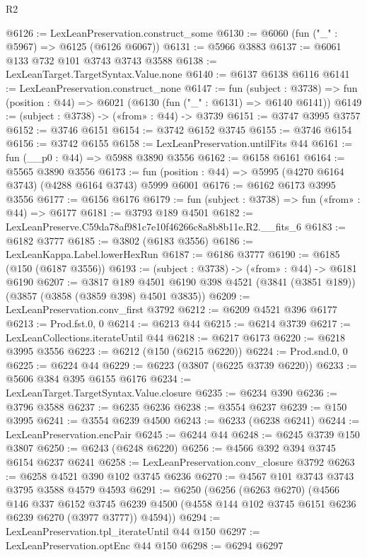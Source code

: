 \begin{lexlean}{R2}
\begin{coremodule}
@6126 := LexLeanPreservation.construct_some
@6130 := @6060 (fun ("_" : @5967) => @6125 (@6126 @6067))
@6131 := @5966 @3883
@6137 := @6061 @133 @732 @101 @3743 @3743 @3588
@6138 := LexLeanTarget.TargetSyntax.Value.none
@6140 := @6137 @6138 @6116
@6141 := LexLeanPreservation.construct_none
@6147 := fun (subject : @3738) =>
  fun (position : @44) => @6021 (@6130 (fun ("_" : @6131) => @6140 @6141))
@6149 := (subject : @3738) -> («from» : @44) -> @3739
@6151 := @3747 @3995 @3757
@6152 := @3746 @6151
@6154 := @3742 @6152 @3745
@6155 := @3746 @6154
@6156 := @3742 @6155
@6158 := LexLeanPreservation.untilFits @44
@6161 := fun (__p0 : @44) => @5988 @3890 @3556
@6162 := @6158 @6161
@6164 := @5565 @3890 @3556
@6173 := fun (position : @44) => @5995 (@4270 @6164 @3743) (@4288 @6164 @3743) @5999 @6001
@6176 := @6162 @6173 @3995 @3556
@6177 := @6156 @6176
@6179 := fun (subject : @3738) => fun («from» : @44) => @6177
@6181 := @3793 @189 @4501
@6182 := LexLeanPreserve.C59da78af981c7e10f46266c8a8b8b11e.R2.__fits_6
@6183 := @6182 @3777
@6185 := @3802 (@6183 @3556)
@6186 := LexLeanKappa.Label.lowerHexRun
@6187 := @6186 @3777
@6190 := @6185 (@150 (@6187 @3556))
@6193 := (subject : @3738) -> («from» : @44) -> @6181 @6190
@6207 := @3817
    @189
    @4501
    @6190
    @398
    @4521
    (@3841 (@3851 @189))
    (@3857 (@3858 (@3859 @398) @4501 @3835))
@6209 := LexLeanPreservation.conv_first @3792
@6212 := @6209 @4521 @396 @6177
@6213 := Prod.fst.{0, 0}
@6214 := @6213 @44
@6215 := @6214 @3739
@6217 := LexLeanCollections.iterateUntil @44
@6218 := @6217 @6173
@6220 := @6218 @3995 @3556
@6223 := @6212 (@150 (@6215 @6220))
@6224 := Prod.snd.{0, 0}
@6225 := @6224 @44
@6229 := @6223 (@3807 (@6225 @3739 @6220))
@6233 := @5606 @384 @395 @6155 @6176
@6234 := LexLeanTarget.TargetSyntax.Value.closure
@6235 := @6234 @390
@6236 := @3796 @3588
@6237 := @6235 @6236
@6238 := @3554 @6237
@6239 := @150 @3995
@6241 := @3554 @6239 @4500
@6243 := @6233 (@6238 @6241)
@6244 := LexLeanPreservation.encPair
@6245 := @6244 @44
@6248 := @6245 @3739 @150 @3807
@6250 := @6243 (@6248 @6220)
@6256 := @4566 @392 @394 @3745 @6154 @6237 @6241
@6258 := LexLeanPreservation.conv_closure @3792
@6263 := @6258 @4521 @390 @102 @3745 @6236
@6270 := @4567 @101 @3743 @3743 @3795 @3588 @4579 @4593
@6291 := @6250
    (@6256
      (@6263 @6270)
      (@4566
        @146
        @337
        @6152
        @3745
        @6239
        @4500
        (@4558 @144 @102 @3745 @6151 @6236 @6239 @6270 (@3977 @3777))
        @4594))
@6294 := LexLeanPreservation.tpl_iterateUntil @44 @150
@6297 := LexLeanPreservation.optEnc @44 @150
@6298 := @6294 @6297

\end{coremodule}
\end{lexlean}
